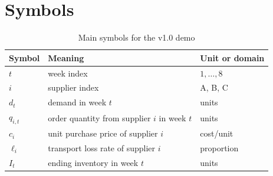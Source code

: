 \section{Symbols}

\begin{table}[htbp]
\centering
\caption{Main symbols for the v1.0 demo}
\label{tab:demo-symbols}
\begin{tabular}{lll}
\toprule
Symbol & Meaning & Unit or domain \\
\midrule
$t$ & week index & $1,\ldots,8$ \\
$i$ & supplier index & A, B, C \\
$d_t$ & demand in week $t$ & units \\
$q_{i,t}$ & order quantity from supplier $i$ in week $t$ & units \\
$c_i$ & unit purchase price of supplier $i$ & cost/unit \\
$\ell_i$ & transport loss rate of supplier $i$ & proportion \\
$I_t$ & ending inventory in week $t$ & units \\
\bottomrule
\end{tabular}
\end{table}
